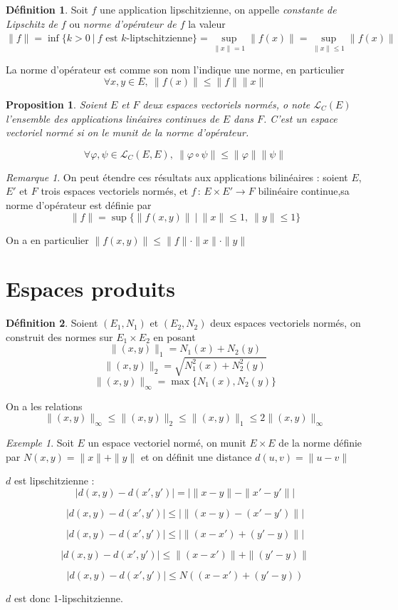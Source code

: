\documentclass[]{article}
\newtheorem{myproposition}{Proposition}
\theoremstyle{remark}
\newtheorem{myrem}{Remarque}
\newtheorem{myexmpl}{Exemple}
\theoremstyle{definition}
\newtheorem{mydef}{Définition}
\newcommand{\funcshort}[3]{
#1 \, : \, #2 \longrightarrow #3
}
\begin{document}
\begin{mydef}
	Soit $f$ une application lipschitzienne, on appelle \textit{constante de Lipschitz de $f$} ou \textit{norme d'opérateur de $f$} la valeur $\|f\| = \inf \{k > 0 ~|~ f \text{ est }k \text{-liptschitzienne}\} = \sup\limits_{\|x\|=1} \|f(x)\| = \sup\limits_{\|x\| \leqslant1} \|f(x)\|$
\end{mydef}

La norme d'opérateur est comme son nom l'indique une norme, en particulier $$\forall x, y \in E, ~ \|f(x)\|\leqslant \|f\|\|x\|$$

\begin{myproposition}
	Soient $E$ et $F$ deux espaces vectoriels normés, o note $\mathcal{L}_C(E)$ l'ensemble des applications linéaires continues de $E$ dans $F$. C'est un espace vectoriel normé si on le munit de la norme d'opérateur.
	
	$$\forall \varphi, \psi \in \mathcal{L}_C(E, E), ~ \|\varphi \circ \psi\| \leqslant \|\varphi\| \|\psi\|$$
\end{myproposition}

\begin{myrem}
	On peut étendre ces résultats aux applications bilinéaires : soient $E$, $E'$ et $F$ trois espaces vectoriels normés, et $\funcshort{f}{E \times E'}{F}$ bilinéaire continue,sa norme d'opérateur est définie par
	$$\|f\| = \sup\{\|f(x, y)\| ~ | ~ \|x\| \leqslant 1, ~ \|y\| \leqslant 1\}$$
	
	On a en particulier $\|f(x,y)\| \leqslant \|f\| \cdot \|x\| \cdot \|y\|$
\end{myrem}

\section{Espaces produits}

\begin{mydef}
	Soient $(E_1, N_1)$ et $(E_2, N_2)$ deux espaces vectoriels normés, on construit des normes sur $E_1 \times E_2$ en posant
	$$\|(x, y)\|_1 = N_1(x) + N_2(y)$$
	$$\|(x, y)\|_2 = \sqrt{N_1^2(x) + N_2^2(y)}$$
	$$\|(x, y)\|_\infty = \max\{N_1(x), N_2(y)\}$$
\end{mydef}

On a les relations $$\|(x, y)\|_\infty \leqslant \|(x, y)\|_2 \leqslant \|(x, y)\|_1 \leqslant 2 \|(x, y)\|_\infty$$

\begin{myexmpl}
	Soit $E$ un espace vectoriel normé, on munit $E \times E$ de la norme définie par $N(x, y)=\|x\|+\|y\|$ et on définit une distance $d(u, v)=\|u-v\|$
	
	$d$ est lipschitzienne :
	$$|d(x, y) - d(x', y')|=|\|x-y\|-\|x'-y'\||$$
	
	$$|d(x, y) - d(x', y')| \leqslant |\|(x-y)-(x'-y')\||$$
	
	$$|d(x, y) - d(x', y')| \leqslant |\|(x-x')+(y'-y)\||$$

	$$|d(x, y) - d(x', y')| \leqslant \|(x-x')\|+\|(y'-y)\|$$
	
	$$|d(x, y) - d(x', y')| \leqslant N((x-x')+(y'-y))$$
	
	$d$ est donc 1-lipschitzienne.
\end{myexmpl}
\end{document}
